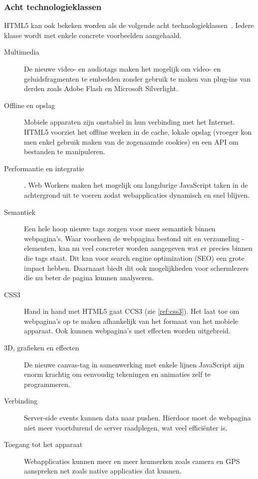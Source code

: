 \subsubsection{Acht technologieklassen}
HTML5 kan ook bekeken worden als de volgende acht technologieklassen~\cite{W3C2012}. Iedere klasse wordt met enkele concrete voorbeelden aangehaald.

\begin{description}
\item [Multimedia] De nieuwe video- en audiotags maken het mogelijk om video- en geluidsfragmenten te embedden zonder gebruik te maken van plug-ins van derden zoals Adobe Flash en Microsoft Silverlight.

\item [Offline en opslag]  Mobiele apparaten zijn onstabiel in hun verbinding met het Internet. HTML5 voorziet het offline werken in de cache, lokale opslag (vroeger kon men enkel gebruik maken van de zogenaamde cookies) en een API om bestanden te manipuleren.

\item [Performantie en integratie].  Web Workers maken het mogelijk om langdurige JavaScript taken in de achtergrond uit te voeren zodat webapplicaties dynamisch en snel blijven.

\item [Semantiek]  Een hele hoop nieuwe tags zorgen voor meer semantiek binnen webpagina's. Waar voorheen de webpagina bestond uit en verzameling -elementen, kan nu veel concreter worden aangegeven wat er precies binnen die tags staat. Dit kan voor search engine optimization (SEO) een grote impact hebben. Daarnaast biedt dit ook mogelijkheden voor schermlezers die nu beter de pagina kunnen analyseren.

\item [CSS3]  Hand in hand met HTML5 gaat CCS3 (zie \ref{ref:css3}). Het laat toe om webpagina's op te maken afhankelijk van het formaat van het mobiele apparaat. Ook kunnen webpagina's met effecten worden uitgebreid. 

\item [3D, grafieken en effecten]  De nieuwe canvas-tag in samenwerking met enkele lijnen JavaScript zijn enorm krachtig om eenvoudig tekeningen en animaties zelf te programmeren.

\item [Verbinding]  Server-side events kunnen data naar  pushen. Hierdoor moet de webpagina niet meer voortdurend de server raadplegen, wat veel efficiënter is.

\item [Toegang tot het apparaat] Webapplicaties kunnen meer en meer kenmerken zoals camera en GPS aanspreken net zoals native applicaties dat kunnen. 
\end{description}

